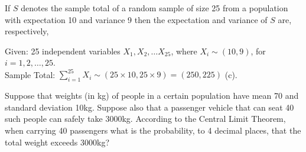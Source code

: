 \documentclass[bigtut]{tutorial}
\begin{document}
\begin{tutorial}
\begin{questions}
\question
If $S$ denotes the sample total of a random sample of size 25 from a population with expectation 10 and variance 9 then the expectation and variance of $S$ are, respectively,
\begin{solution}
Given: 25 independent variables $X_{1}, X_{2}, \ldots X_{25}$, where $X_{i} \sim (10,9)$, for $i=1,2,\ldots,25$.  \\
Sample Total: $\sum_{i=1}^{25} X_{i} \sim (25 \times 10, 25 \times 9) = (250,225)$ (c).
\end{solution}



\question
Suppose that weights (in kg) of people in a certain population have mean 70 and standard deviation 10kg. Suppose also that a passenger vehicle that can seat 40 such people can safely take 3000kg. According to the Central Limit Theorem, when carrying 40 passengers what is the probability, to 4 decimal places, that the total weight exceeds 3000kg?
\end{questions}
\end{tutorial}
\end{document}
